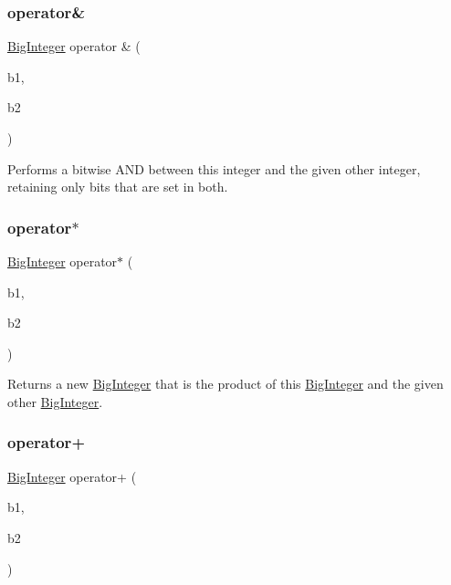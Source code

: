 \subsubsection{\texorpdfstring{operator\&}{operator\&}}
{\footnotesize\ttfamily \mbox{\hyperlink{classBigInteger}{Big\+Integer}} operator \& (\begin{DoxyParamCaption}\item[{const \mbox{\hyperlink{classBigInteger}{Big\+Integer}} \&}]{b1,  }\item[{const \mbox{\hyperlink{classBigInteger}{Big\+Integer}} \&}]{b2 }\end{DoxyParamCaption})\hspace{0.3cm}{\ttfamily [friend]}}



Performs a bitwise A\+ND between this integer and the given other integer, retaining only bits that are set in both. 

\mbox{\label{classBigInteger_a8e6b00948ebc54ab67bb17c41007fb3c}} 
\subsubsection{\texorpdfstring{operator$\ast$}{operator*}}
{\footnotesize\ttfamily \mbox{\hyperlink{classBigInteger}{Big\+Integer}} operator$\ast$ (\begin{DoxyParamCaption}\item[{const \mbox{\hyperlink{classBigInteger}{Big\+Integer}} \&}]{b1,  }\item[{const \mbox{\hyperlink{classBigInteger}{Big\+Integer}} \&}]{b2 }\end{DoxyParamCaption})\hspace{0.3cm}{\ttfamily [friend]}}



Returns a new \mbox{\hyperlink{classBigInteger}{Big\+Integer}} that is the product of this \mbox{\hyperlink{classBigInteger}{Big\+Integer}} and the given other \mbox{\hyperlink{classBigInteger}{Big\+Integer}}. 

\mbox{\label{classBigInteger_a60c054a92aedb2aabf4b18d1fece1773}} 
\subsubsection{\texorpdfstring{operator+}{operator+}}
{\footnotesize\ttfamily \mbox{\hyperlink{classBigInteger}{Big\+Integer}} operator+ (\begin{DoxyParamCaption}\item[{const \mbox{\hyperlink{classBigInteger}{Big\+Integer}} \&}]{b1,  }\item[{const \mbox{\hyperlink{classBigInteger}{Big\+Integer}} \&}]{b2 }\end{DoxyParamCaption})\hspace{0.3cm}{\ttfamily [friend]}}



